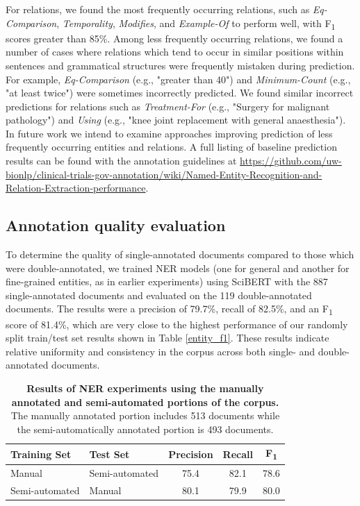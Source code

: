 \documentclass[fleqn,10pt]{wlscirep}
\begin{document}
\noindent For relations, we found the most frequently occurring relations, such as \textit{Eq-Comparison}, \textit{Temporality}, \textit{Modifies}, and \textit{Example-Of} to perform well, with F\textsubscript{1} scores greater than 85\%. Among less frequently occurring relations, we found a number of cases where relations which tend to occur in similar positions within sentences and grammatical structures were frequently mistaken during prediction. For example, \textit{Eq-Comparison} (e.g., "greater than 40") and \textit{Minimum-Count} (e.g., "at least twice") were sometimes incorrectly predicted. We found similar incorrect predictions for relations such as \textit{Treatment-For} (e.g., "Surgery for malignant pathology") and \textit{Using} (e.g., "knee joint replacement with general anaesthesia"). \\

\noindent In future work we intend to examine approaches improving prediction of less frequently occurring entities and relations. A full listing of baseline prediction results can be found with the annotation guidelines at \url{https://github.com/uw-bionlp/clinical-trials-gov-annotation/wiki/Named-Entity-Recognition-and-Relation-Extraction-performance}. \\

\subsection*{Annotation quality evaluation}
\noident To determine the quality of single-annotated documents compared to those which were double-annotated, we trained NER models (one for general and another for fine-grained entities, as in earlier experiments) using SciBERT with the 887 single-annotated documents and evaluated on the 119 double-annotated documents. The results were a precision of 79.7\%, recall of 82.5\%, and an F\textsubscript{1} score of 81.4\%, which are very close to the highest performance of our randomly split train/test set results shown in Table \ref{entity_f1}. These results indicate relative uniformity and consistency in the corpus across both single- and double-annotated documents. \\

\def\arraystretch{1.2}
\begin{table}[h!]
\centering
\begin{tabular}{l l c c c}
 \toprule
 \textbf{Training Set} & \textbf{Test Set} & \textbf{Precision} & \textbf{Recall} & \textbf{F\textsubscript{1}} \\
 \hline
    Manual & Semi-automated & 75.4 & 82.1 & 78.6 \\
    Semi-automated & Manual & 80.1 & 79.9 & 80.0 \\
 \hline
\end{tabular}
\caption{\textbf{Results of NER experiments using the manually annotated and semi-automated portions of the corpus.} The manually annotated portion includes 513 documents while the semi-automatically annotated portion is 493 documents.}
\label{tbl_manual_semiauto}
\end{table}
\end{document}
